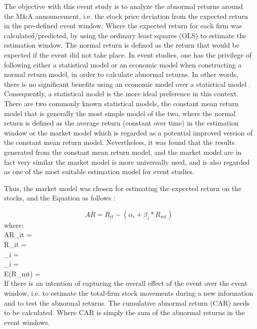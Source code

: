 The objective with this event study is to analyze the abnormal returns around the M\&A announcement, i.e. the stock price deviation from the expected return in the pre-defined event window. Where the expected return for each firm was calculated/predicted, by using the ordinary least squares (OLS) to estimate the estimation window.  The normal return is defined as the return that would be expected if the event did not take place. In event studies, one has the privilege of following either a statistical model or an economic model when constructing a normal return model, in order to calculate abnormal returns. In other words, there is no significant benefits using an economic model over a statistical model \cite{mackinlay1997}. Consequently, a statistical model is the more ideal preference in this context.
There are two commonly known statistical models, the constant mean return model that is generally the most simple model of the two, where the normal return is defined as the average return (constant over time) in the estimation window or the market model  which is regarded as a potential improved version of the constant mean return model. Nevertheless, it was found \cite{BROWN1980205} that the results generated from the constant mean return model, and the market model are in fact very similar the market model is more universally used, and is also regarded as one of the most suitable estimation model for event studies. 

Thus, the market model was chosen for estimating the expected return on the stocks, and the Equation as follows \cite{mackinlay1997}:

\begin{equation}
AR = R_{it} - (\alpha_i + \beta_i * R_{mt})
\label{eqn:AR}
\end{equation}
where:\\
AR\_{it} =  \\
R\_{it} =  \\
\alpha\_i =   \\
\beta\_i =  \\
E(R\_{mt}) = \\


If there is an intention of capturing the overall effect of the event over the event window, i.e. to estimate the total-firm stock movements during a new information and to test the abnormal returns. The cumulative abnormal return (CAR) needs to be calculated. Where CAR is simply the sum of the abnormal returns in the event windows.

